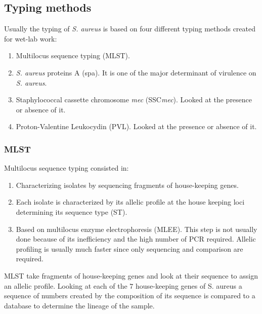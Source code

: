    \subsection{Typing methods}
    Usually the typing of \emph{S. aureus} is based on four different typing methods created for wet-lab work:

    \begin{multicols}{2}
        \begin{enumerate}
            \item Multilocus sequence typing (MLST).
            \item \emph{S. aureus} proteins A (spa).
                It is one of the major determinant of virulence on \emph{S. aureus}.
            \item Staphylococcal cassette chromosome \emph{mec} (SSC\emph{mec}).
                Looked at the presence or absence of it.
            \item Proton-Valentine Leukocydin (PVL).
                Looked at the presence or absence of it.
        \end{enumerate}
    \end{multicols}

        \subsubsection{MLST}
        Multilocus sequence typing consisted in:

        \begin{multicols}{2}
            \begin{enumerate}
                \item Characterizing isolates by sequencing fragments of house-keeping genes.
                \item Each isolate is characterized by its allelic profile at the house keeping loci determining its sequence type (ST).
                \item Based on multilocus enzyme electrophoresis (MLEE).
                    This step is not usually done because of its inefficiency and the high number of PCR required.
                    Allelic profiling is usually much faster since only sequencing and comparison are required.
            \end{enumerate}
        \end{multicols}

        MLST take fragments of house-keeping genes and look at their sequence to assign an allelic profile.
        Looking at each of the $7$ house-keeping genes of S. aureus a sequence of numbers created by the composition of its sequence is compared to a database to determine the lineage of the sample.

